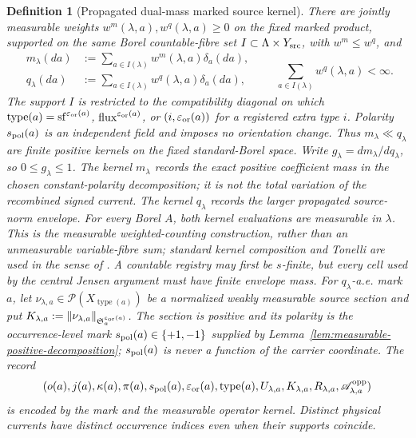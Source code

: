 \documentclass[11pt]{article}
\newtheorem{definition}[theorem]{Definition}
\begin{document}
\begin{definition}[Propagated dual-mass marked source kernel]
There are jointly measurable
weights $w^m(\lambda,a),w^q(\lambda,a)\ge0$ on the fixed marked product,
supported on the same Borel countable-fibre set
$I\subset\Lambda\times Y_{\rm src}$, with $w^m\le w^q$, and
\begin{equation}
\label{eq:marked-weighted-counting-kernel}
 \begin{aligned}
 m_\lambda(da)&:=\sum_{a\in I(\lambda)}w^m(\lambda,a)\delta_a(da),\\
 q_\lambda(da)&:=\sum_{a\in I(\lambda)}w^q(\lambda,a)\delta_a(da),
 \end{aligned}
 \qquad
 \sum_{a\in I(\lambda)}w^q(\lambda,a)<\infty.
\end{equation}
The support $I$ is restricted to the compatibility diagonal on which
$\operatorname{type}(a)=\mathrm{sf}^{\varepsilon_{\rm or}(a)}$,
$\mathrm{flux}^{\varepsilon_{\rm or}(a)}$, or
$(i,\varepsilon_{\rm or}(a))$ for a registered extra type $i$.  Polarity
$s_{\rm pol}(a)$ is an independent field and imposes no orientation change.
Thus $m_\lambda\ll q_\lambda$ are finite positive kernels on the fixed
standard-Borel space.  Write $g_\lambda=dm_\lambda/dq_\lambda$, so
$0\le g_\lambda\le1$.  The kernel $m_\lambda$ records the exact positive
coefficient mass in the chosen constant-polarity decomposition; it is not
the total variation of the recombined signed current.  The kernel
$q_\lambda$ records the larger propagated source-norm envelope.
For every Borel $A$, both kernel evaluations are measurable in $\lambda$.
This is the measurable weighted-counting construction, rather than an
unmeasurable variable-fibre sum; standard kernel composition and Tonelli are
used in the sense of \cite{VakarOng}.  A countable registry may first be
$s$-finite, but every cell used by the central Jensen argument must have
finite envelope mass.  For $q_\lambda$-a.e. mark $a$, let
$\nu_{\lambda,a}\in\mathcal P(X_{\operatorname{type}(a)})$ be a normalized
weakly measurable source section and put
$K_{\lambda,a}:=\|\nu_{\lambda,a}\|_{
\mathfrak S_a^{\varepsilon_{\rm or}(a)}}$.
The section is positive and its polarity is the occurrence-level mark
$s_{\rm pol}(a)\in\{+1,-1\}$ supplied by
Lemma~\ref{lem:measurable-positive-decomposition}; $s_{\rm pol}(a)$ is never a
function of the carrier coordinate.
The record
\begin{equation}
\label{eq:source-incidence-record}
 (o(a),j(a),\kappa(a),\pi(a),s_{\rm pol}(a),
   \varepsilon_{\rm or}(a),\operatorname{type}(a),
   U_{\lambda,a},K_{\lambda,a},R_{\lambda,a},
   \mathscr A_{\lambda,a}^{\rm opp})
\end{equation}
is encoded by the mark and the measurable operator kernel.  Distinct
physical currents have distinct occurrence indices even when their supports
coincide.


\end{definition}
\end{document}
